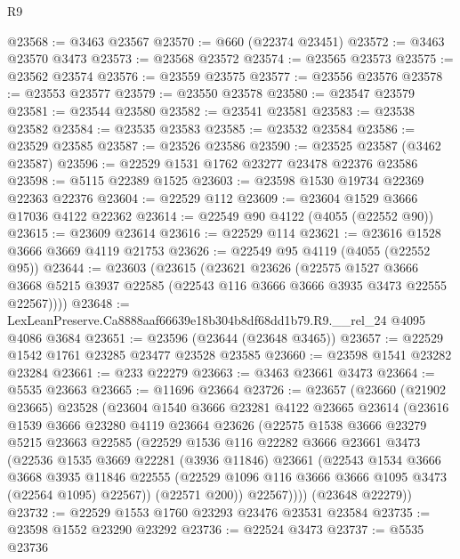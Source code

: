 \begin{lexlean}{R9}
\begin{coremodule}
@23568 := @3463 @23567
@23570 := @660 (@22374 @23451)
@23572 := @3463 @23570 @3473
@23573 := @23568 @23572
@23574 := @23565 @23573
@23575 := @23562 @23574
@23576 := @23559 @23575
@23577 := @23556 @23576
@23578 := @23553 @23577
@23579 := @23550 @23578
@23580 := @23547 @23579
@23581 := @23544 @23580
@23582 := @23541 @23581
@23583 := @23538 @23582
@23584 := @23535 @23583
@23585 := @23532 @23584
@23586 := @23529 @23585
@23587 := @23526 @23586
@23590 := @23525 @23587 (@3462 @23587)
@23596 := @22529 @1531 @1762 @23277 @23478 @22376 @23586
@23598 := @5115 @22389 @1525
@23603 := @23598 @1530 @19734 @22369 @22363 @22376
@23604 := @22529 @112
@23609 := @23604 @1529 @3666 @17036 @4122 @22362
@23614 := @22549 @90 @4122 (@4055 (@22552 @90))
@23615 := @23609 @23614
@23616 := @22529 @114
@23621 := @23616 @1528 @3666 @3669 @4119 @21753
@23626 := @22549 @95 @4119 (@4055 (@22552 @95))
@23644 := @23603
    (@23615
      (@23621
        @23626
        (@22575
          @1527
          @3666
          @3668
          @5215
          @3937
          @22585
          (@22543 @116 @3666 @3666 @3935 @3473 @22555 @22567))))
@23648 := LexLeanPreserve.Ca8888aaf66639e18b304b8df68dd1b79.R9.__rel_24 @4095 @4086 @3684
@23651 := @23596 (@23644 (@23648 @3465))
@23657 := @22529 @1542 @1761 @23285 @23477 @23528 @23585
@23660 := @23598 @1541 @23282 @23284
@23661 := @233 @22279
@23663 := @3463 @23661 @3473
@23664 := @5535 @23663
@23665 := @11696 @23664
@23726 := @23657
    (@23660
      (@21902 @23665)
      @23528
      (@23604
        @1540
        @3666
        @23281
        @4122
        @23665
        @23614
        (@23616
          @1539
          @3666
          @23280
          @4119
          @23664
          @23626
          (@22575
            @1538
            @3666
            @23279
            @5215
            @23663
            @22585
            (@22529
              @1536
              @116
              @22282
              @3666
              @23661
              @3473
              (@22536
                @1535
                @3669
                @22281
                (@3936 @11846)
                @23661
                (@22543
                  @1534
                  @3666
                  @3668
                  @3935
                  @11846
                  @22555
                  (@22529 @1096 @116 @3666 @3666 @1095 @3473 (@22564 @1095) @22567))
                (@22571 @200))
              @22567))))
      (@23648 @22279))
@23732 := @22529 @1553 @1760 @23293 @23476 @23531 @23584
@23735 := @23598 @1552 @23290 @23292
@23736 := @22524 @3473
@23737 := @5535 @23736

\end{coremodule}
\end{lexlean}
